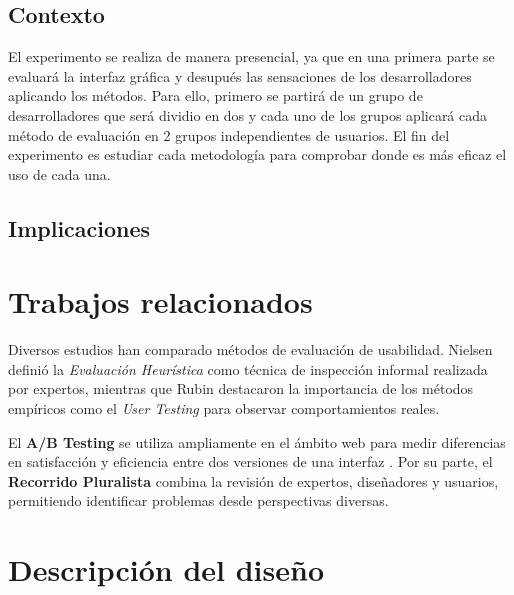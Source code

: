 \documentclass[a4paper,12pt]{report}
\begin{document}
\section{Contexto}
El experimento se realiza de manera presencial, ya que en una primera parte se evaluará la interfaz gráfica y desupués las sensaciones de los desarrolladores aplicando los métodos. Para ello, primero se partirá de un grupo de desarrolladores que será dividio en dos y cada uno de los grupos aplicará cada método de evaluación en 2 grupos independientes de usuarios. El fin del experimento es estudiar cada metodología para comprobar donde es más eficaz el uso de cada una.

\section{Implicaciones}

\chapter{Trabajos relacionados}

Diversos estudios han comparado métodos de evaluación de usabilidad. Nielsen \cite{nielsen1994usability} definió la \textit{Evaluación Heurística} como técnica de inspección informal realizada por expertos, mientras que Rubin \cite{rubin2011handbook} destacaron la importancia de los métodos empíricos como el \textit{User Testing} para observar comportamientos reales.  

El \textbf{A/B Testing} se utiliza ampliamente en el ámbito web para medir diferencias en satisfacción y eficiencia entre dos versiones de una interfaz \cite{kohavi2009controlled}. Por su parte, el \textbf{Recorrido Pluralista} \cite{biasPluralistic} combina la revisión de expertos, diseñadores y usuarios, permitiendo identificar problemas desde perspectivas diversas.


\chapter{Descripción del diseño}
\end{document}
